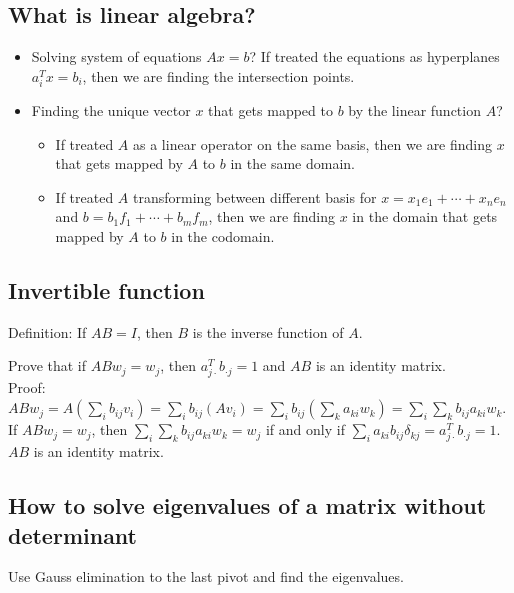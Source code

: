 \subsection{What is linear algebra?} 
    \begin{itemize} 
        \item Solving system of equations $Ax = b$?  If treated the equations as hyperplanes $a_i^{T}x = b_i$, then we are finding the intersection points.  
        \item Finding the unique vector $x$ that gets mapped to $b$ by the linear function $A$?  
        \begin{itemize} 
            \item If treated $A$ as a linear operator on the same basis, then we are 
                  finding $x$ that gets mapped by $A$ to $b$ in the same domain.  
            \item If treated $A$ transforming between different basis for 
                  $x=x_{1}e_{1} + \cdots + x_{n}e_{n}$ and $b = b_{1}f_{1} + \cdots + b_{m}f_{m}$, 
                  then we are finding $x$ in the domain that gets mapped by $A$ to $b$ in the codomain.  
       \end{itemize} 
    \end{itemize}

\subsection{Invertible function} Definition: If $AB = I$, then $B$ is the inverse function of $A$.  \\
    \begin{exmp}
        Prove that if $ABw_{j} = w_{j}$, then $a_{j \cdot}^{T}b_{\cdot j} = 1$ and $AB$ is an identity matrix. \\ 
        Proof: \\ 
        $ABw_{j} = A(\sum_i b_{ij}v_i) = \sum_{i} b_{ij}(Av_{i}) = \sum_{i} b_{ij}(\sum_k a_{ki} w_{k}) = \sum_i\sum_{k} b_{ij} a_{ki} w_{k} $.  
        If $ABw_{j} = w_{j}$, then $\sum_{i}\sum_{k} b_{ij} a_{ki}w_{k} = w_{j}$ if and only if  $\sum_{i} a_{ki}b_{ij} \delta_{kj} = a_{j\cdot}^{T}b_{\cdot j} = 1$.  
        $AB$ is an identity matrix. 
    \end{exmp}

\subsection{How to solve eigenvalues of a matrix without determinant}
    Use Gauss elimination to the last pivot and find the eigenvalues.


